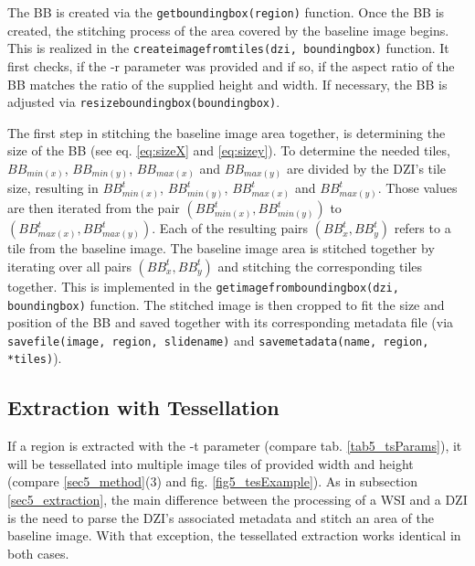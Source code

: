 The BB is created via the \texttt{get{\textunderscore}bounding{\textunderscore}box(region)} function. Once the BB is created, the stitching process of the area covered by the baseline image begins. This is realized in the \texttt{create{\textunderscore}image{\textunderscore}from{\textunderscore}tiles(dzi, bounding{\textunderscore}box)} function. It first checks, if the -r parameter was provided and if so, if the aspect ratio of the BB matches the ratio of the supplied height and width. If necessary, the BB is adjusted via \texttt{resize{\textunderscore}bounding{\textunderscore}box(bounding{\textunderscore}box)}.
 
The first step in stitching the baseline image area together, is determining the size of the BB (see eq. \ref{eq:sizeX} and \ref{eq:sizey}). To determine the needed tiles, $BB_{min(x)}$, $BB_{min(y)}$, $BB_{max(x)}$ and $BB_{max(y)}$ are divided by the DZI's tile size, resulting in $BB_{min(x)}^t$, $BB_{min(y)}^t$, $BB_{max(x)}^t$ and $BB_{max(y)}^t$. Those values are then iterated from the pair $(BB_{min(x)}^t, BB_{min(y)}^t)$ to $(BB_{max(x)}^t, BB_{max(y)}^t)$. Each of the resulting pairs $(BB_x^t, BB_y^t)$ refers to a tile from the baseline image. The baseline image area is stitched together by iterating over all pairs $(BB_x^t, BB_y^t)$ and stitching the corresponding tiles together. This is implemented in the \texttt{get{\textunderscore}image{\textunderscore}from{\textunderscore}bounding{\textunderscore}box(dzi, bounding{\textunderscore}box)} function. The stitched image is then cropped to fit the size and position of the BB and saved together with its corresponding metadata file (via \texttt{save{\textunderscore}file(image, region, slide{\textunderscore}name)} and \texttt{save{\textunderscore}metadata(name, region, *tiles)}).


\subsection{Extraction with Tessellation}
\label{sec5_tessellation}

If a region is extracted with the -t parameter (compare tab. \ref{tab5_tsParams}), it will be tessellated into multiple image tiles of provided width and height (compare \ref{sec5_method}(3) and fig. \ref{fig5_tesExample}). As in subsection \ref{sec5_extraction}, the main difference between the processing of a WSI and a DZI is the need to parse the DZI's associated metadata and stitch an area of the baseline image. With that exception, the tessellated extraction works identical in both cases.

